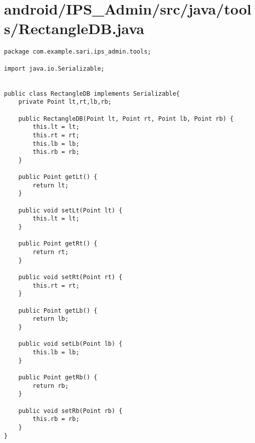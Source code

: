 \section{android/IPS\_Admin/src/java/tools/RectangleDB.java}
\begin{lstlisting}package com.example.sari.ips_admin.tools;

import java.io.Serializable;


public class RectangleDB implements Serializable{
    private Point lt,rt,lb,rb;

    public RectangleDB(Point lt, Point rt, Point lb, Point rb) {
        this.lt = lt;
        this.rt = rt;
        this.lb = lb;
        this.rb = rb;
    }

    public Point getLt() {
        return lt;
    }

    public void setLt(Point lt) {
        this.lt = lt;
    }

    public Point getRt() {
        return rt;
    }

    public void setRt(Point rt) {
        this.rt = rt;
    }

    public Point getLb() {
        return lb;
    }

    public void setLb(Point lb) {
        this.lb = lb;
    }

    public Point getRb() {
        return rb;
    }

    public void setRb(Point rb) {
        this.rb = rb;
    }
}
\end{lstlisting}
\newpage
